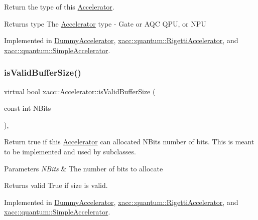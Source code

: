 Return the type of this \hyperlink{a01435}{Accelerator}.

\begin{DoxyReturn}{Returns}
type The \hyperlink{a01435}{Accelerator} type -\/ Gate or A\+QC Q\+PU, or N\+PU 
\end{DoxyReturn}


Implemented in \hyperlink{a01143_acdfe3e856f2bacc9e0dc1a51782a52e3}{Dummy\+Accelerator}, \hyperlink{a01083_aab0d4674da5273d55407b9ab77cde890}{xacc\+::quantum\+::\+Rigetti\+Accelerator}, and \hyperlink{a01111_ad76eeb0bbd7de21aad5bd20d20970a98}{xacc\+::quantum\+::\+Simple\+Accelerator}.

\mbox{\label{a01435_ae51584850faeec77299058383977ddeb}} 
\subsubsection{\texorpdfstring{is\+Valid\+Buffer\+Size()}{isValidBufferSize()}}
{\footnotesize\ttfamily virtual bool xacc\+::\+Accelerator\+::is\+Valid\+Buffer\+Size (\begin{DoxyParamCaption}\item[{const int}]{N\+Bits }\end{DoxyParamCaption})\hspace{0.3cm}{\ttfamily [protected]}, {}}

Return true if this \hyperlink{a01435}{Accelerator} can allocated N\+Bits number of bits. This is meant to be implemented and used by subclasses.


\begin{DoxyParams}{Parameters}
{\em N\+Bits} & The number of bits to allocate \\
\hline
\end{DoxyParams}
\begin{DoxyReturn}{Returns}
valid True if size is valid. 
\end{DoxyReturn}


Implemented in \hyperlink{a01143_a831ad0c71864920cc49a00d29768af8c}{Dummy\+Accelerator}, \hyperlink{a01083_a61352c07062597aad2393fbeed4cc025}{xacc\+::quantum\+::\+Rigetti\+Accelerator}, and \hyperlink{a01111_a60b9db2d6aed235857c45413a070338e}{xacc\+::quantum\+::\+Simple\+Accelerator}.

\mbox{\label{a01435_ac3e781f42ec25e460174d4c41ea26b94}} 
